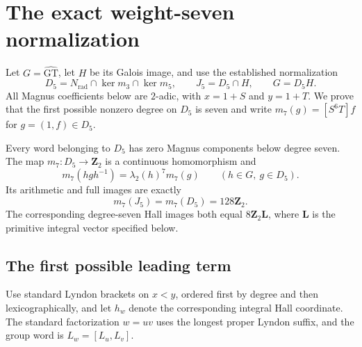 \section{The exact weight-seven normalization}
\label{sec:weight-seven-partial}

Let $G=\widehat{\mathrm{GT}}$, let $H$ be its Galois image, and use
the established normalization
\[
 D_5=N_{\mathrm{rad}}\cap\ker m_3\cap\ker m_5,
 \qquad J_5=D_5\cap H,
 \qquad G=D_5H.
\]
All Magnus coefficients below are $2$-adic, with $x=1+S$ and $y=1+T$.
We prove that the first possible nonzero degree on $D_5$ is seven and
write $m_7(g)=[S^6T]f$ for $g=(1,f)\in D_5$.

\begin{theorem}\label{thm:weight-seven-bounds}
Every word belonging to $D_5$ has zero Magnus components below degree
seven. The map $m_7:D_5\to\mathbf Z_2$ is a continuous homomorphism and
\[
 m_7(hgh^{-1})=\lambda_2(h)^7m_7(g)
 \qquad(h\in G,\ g\in D_5).
\]
Its arithmetic and full images are exactly
\begin{equation}\label{eq:weight-seven-image-interval}
 m_7(J_5)=m_7(D_5)=128\mathbf Z_2.
\end{equation}
The corresponding degree-seven Hall images both equal
$8\mathbf Z_2\mathbf L$, where $\mathbf L$ is the primitive
integral vector specified below.
\end{theorem}

\subsection{The first possible leading term}

Use standard Lyndon brackets on $x<y$, ordered first by degree and
then lexicographically, and let $h_w$ denote the corresponding integral
Hall coordinate. The standard factorization $w=uv$ uses the longest
proper Lyndon suffix, and the group word is $L_w=[L_u,L_v]$.

